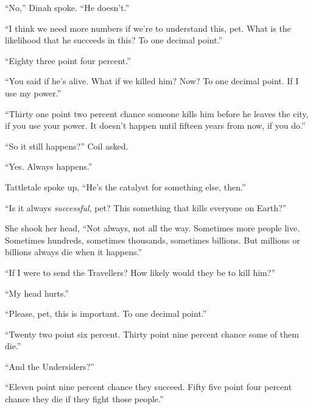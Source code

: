 ``No,'' Dinah spoke.  ``He doesn't.''



``I think we need more numbers if we're to understand this, pet.  What is the likelihood that he succeeds in this?  To one decimal point.''



``Eighty three point four percent.''



``You said if he's alive.  What if we killed him?  Now?  To one decimal point.  If I use my power.''



``Thirty one point two percent chance someone kills him before he leaves the city, if you use your power.  It doesn't happen until fifteen years from now, if you do.''



``So it still happens?'' Coil asked.



``Yes.  Always happens.''



Tattletale spoke up, ``He's the catalyst for something else, then.''



``Is it always \emph{successful}, pet?  This something that kills everyone on Earth?''



She shook her head, ``Not always, not all the way.  Sometimes more people live.  Sometimes hundreds, sometimes thousands, sometimes billions.  But millions or billions always die when it happens.''



``If I were to send the Travellers?  How likely would they be to kill him?''



``My head hurts.''



``Please, pet, this is important.  To one decimal point.''



``Twenty two point six percent.  Thirty point nine percent chance some of them die.''



``And the Undersiders?''



``Eleven point nine percent chance they succeed.  Fifty five point four percent chance they die if they fight those people.''



